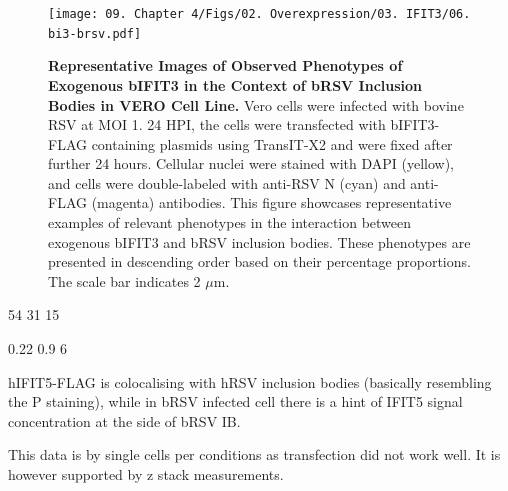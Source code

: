 \begin{figure}
    \centering
    \texttt{[image: 09. Chapter 4/Figs/02. Overexpression/03. IFIT3/06. bi3-brsv.pdf]}
    \caption[Representative Images of Observed Phenotypes of Exogenous bIFIT3 in the Context of bRSV Inclusion Bodies in VERO Cell Line.]{\textbf{Representative Images of Observed Phenotypes of Exogenous bIFIT3 in the Context of bRSV Inclusion Bodies in VERO Cell Line.} Vero cells were infected with bovine RSV at MOI 1. 24 HPI, the cells were transfected with bIFIT3-FLAG containing plasmids using TransIT-X2 and were fixed after further 24 hours. Cellular nuclei were stained with DAPI (yellow), and cells were double-labeled with anti-RSV N (cyan) and anti-FLAG (magenta) antibodies. This figure showcases representative examples of relevant phenotypes in the interaction between exogenous bIFIT3 and bRSV inclusion bodies. These phenotypes are presented in descending order based on their percentage proportions. The scale bar indicates 2 \(\mu \mbox{m}\).}
    \label{fig:Representative Images of Observed Phenotypes of Exogenous bIFIT3 in the Context of bRSV Inclusion Bodies in VERO Cell Line}
\end{figure}

54 31 15

0.22 0.9 6

hIFIT5-FLAG is colocalising with hRSV inclusion bodies (basically resembling the P staining), while in bRSV infected cell there is a hint of IFIT5 signal concentration at the side of bRSV IB.

This data is by single cells per conditions as transfection did not work well. It is however supported by z stack measurements.

